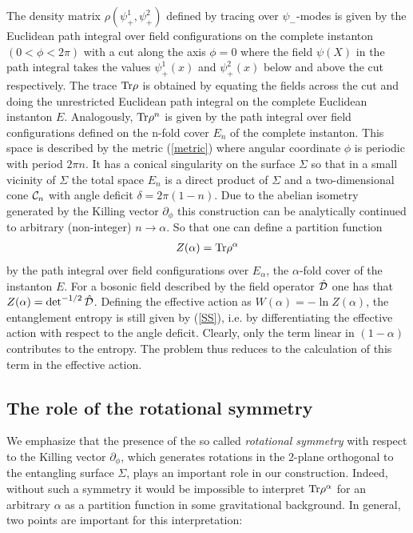\documentclass[12pt]{article}
\def\tr{\hbox{Tr}}
\def\be{\begin{eqnarray}}
\def\ee{\end{eqnarray}}
\def\lb{\label}
\begin{document}
The density matrix $\rho(\psi_+^1,\psi_+^2)$ defined by tracing over $\psi_-$-modes is given by the Euclidean path integral over 
field configurations on the complete instanton $ (0< \phi <2\pi )$ with a cut along the axis $\phi=0$ where the field $\psi(X)$ in the path integral takes the values $\psi_+^1(x)$ and $\psi_+^2(x)$ below and above the cut respectively. The trace $\tr \rho$ is obtained by equating
the fields across the cut and doing the unrestricted Euclidean path integral on the complete Euclidean instanton $E$.  Analogously, $\tr \rho^n$
is given by the path integral over field configurations defined on the n-fold cover $E_n$ of the complete instanton.  This space is described by the metric
(\ref{metric}) where angular coordinate $\phi$ is periodic with  period $2\pi n$. It has  a conical singularity on the surface $\Sigma$ so that
in a small vicinity of $\Sigma$ the total space $E_n$ is a direct product of $\Sigma$ and a two-dimensional cone ${\cal C}_n$ with angle deficit $\delta=2\pi (1-n)$. Due to the abelian isometry generated by the Killing vector $\partial_\phi$ this construction can be analytically continued to arbitrary (non-integer) $n\rightarrow \alpha$. So that one can define a partition function 
\be
Z(\alpha)=\tr \rho^\alpha
\lb{Z}
\ee
by the path integral over field configurations over $E_\alpha$, the $\alpha$-fold cover of the instanton $E$. 
For a bosonic field described by the field operator $\hat{\cal D}$ one has that $Z(\alpha)=\det^{-1/2}\hat{\cal D}$.
Defining the effective action as
$W(\alpha)=-\ln Z(\alpha)$, the entanglement entropy is still given by (\ref{SS}), i.e. by differentiating the effective action with respect to the angle deficit. Clearly, only the term linear in $(1-\alpha)$ contributes to the entropy. The problem thus reduces to the calculation of this term in the effective action.

\subsection{The role of the rotational symmetry} 
We emphasize  that the presence of the so called {\it rotational symmetry}
with respect to the Killing vector $\partial_\phi$, which generates rotations in the 2-plane orthogonal to the entangling surface $\Sigma$, plays an important role in our construction. Indeed, without such a symmetry it would be impossible to interpret $\tr \rho^\alpha$ for an arbitrary $\alpha$ as a partition function in some gravitational background. In general,  two points are important for this interpretation:
\end{document}

